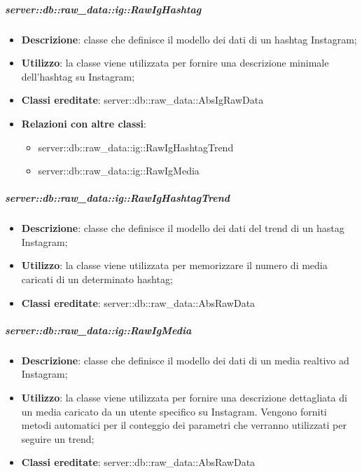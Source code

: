 		\subparagraph{server::db::raw\_data::ig::RawIgHashtag} %
		\label{subp:server_db_raw_data_ig_rawighashtag}
			\begin{itemize}
				\item \textbf{Descrizione}: classe che definisce il modello dei dati di un hashtag Instagram;
				\item \textbf{Utilizzo}: la classe viene utilizzata per fornire una descrizione minimale dell'hashtag su Instagram;
				\item \textbf{Classi ereditate}: server::db::raw\_data::AbsIgRawData
				\item \textbf{Relazioni con altre classi}:
					\begin{itemize}
						\item server::db::raw\_data::ig::RawIgHashtagTrend
						\item server::db::raw\_data::ig::RawIgMedia
					\end{itemize}
			\end{itemize}


		\subparagraph{server::db::raw\_data::ig::RawIgHashtagTrend} %
		\label{subp:server_db_raw_data_ig_rawighashtagtrend}
			\begin{itemize}
				\item \textbf{Descrizione}: classe che definisce il modello dei dati del trend di un hastag Instagram;
				\item \textbf{Utilizzo}: la classe viene utilizzata per memorizzare il numero di media caricati di un determinato hashtag;
				\item \textbf{Classi ereditate}: server::db::raw\_data::AbsRawData
			\end{itemize}


		\subparagraph{server::db::raw\_data::ig::RawIgMedia} %
		\label{subp:server_db_raw_data_ig_rawigmedia}
			\begin{itemize}
				\item \textbf{Descrizione}: classe che definisce il modello dei dati di un media realtivo ad Instagram;
				\item \textbf{Utilizzo}: la classe viene utilizzata per fornire una descrizione dettagliata di un media caricato da un utente specifico su Instagram. Vengono forniti metodi automatici per il conteggio dei parametri che verranno utilizzati per seguire un trend;
				\item \textbf{Classi ereditate}: server::db::raw\_data::AbsRawData
			\end{itemize}


